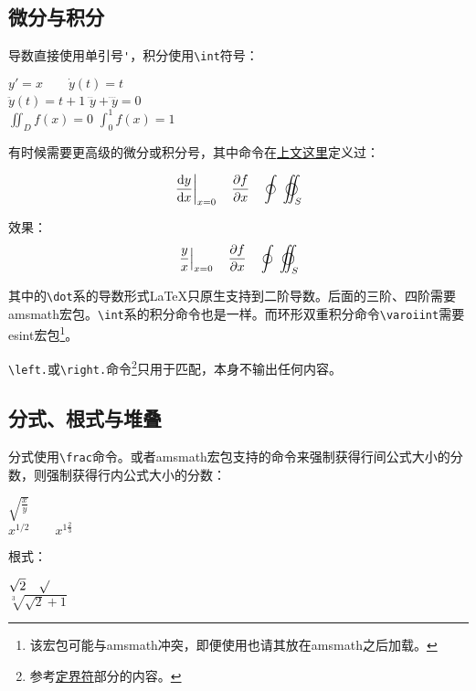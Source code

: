 {\subsection{微分与积分}
导数直接使用单引号\verb|'|，积分使用\verb|\int|符号：

\begin{codeshow}
$y'=x \qquad \dot{y}(t)=t$ \\
$\ddot{y}(t)=t+1$
$\dddot{y}+\ddddot{y}=0$ \\
$\iint_{D}f(x)=0$
$\int_{0}^{1}f(x)=1$
\end{codeshow}

有时候需要更高级的微分或积分号，其中\latexline{\\ud}命令在\hyperref[cmd:ud]{上文这里}定义过：
\begin{latex}{}
\[\left.\frac{\ud y}{\ud x}\right|_{x=0}
\quad\frac{\partial f}{\partial x}
\quad\oint\;\varoiint_S \]
\end{latex}

效果：
\[\left.\frac{y}{x}\right|_{x=0}
\quad\frac{\partial f}{\partial x}\quad
\oint\;\varoiint_S \]

其中的\verb|\dot|系的导数形式\LaTeX 只原生支持到二阶导数。后面的三阶、四阶需要amsmath宏包。\verb|\int|系的积分命令也是一样。而环形双重积分命令\verb|\varoiint|需要esint宏包\footnote{该宏包可能与amsmath冲突，即便使用也请其放在amsmath之后加载。}。

\verb|\left.|或\verb|\right.|命令\footnote{参考\hyperref[subsec:delimiter]{定界符}部分的内容。}只用于匹配，本身不输出任何内容。

\subsection{分式、根式与堆叠}
分式使用\verb|\frac|命令。或者amsmath宏包支持的\latexline{\\dfrac}命令来强制获得行间公式大小的分数，\latexline{\\tfrac}则强制获得行内公式大小的分数：

\begin{codeshow}
  $\sqrt{\frac{x}{y}}$ \\
  $x^{1/2} \qquad x^{1\frac{2}{3}}$
\end{codeshow}

根式：

\begin{codeshow}
  $\sqrt{2} \quad \surd$ \\
  $\sqrt[3]{\sqrt{2}+1}$
\end{codeshow}

}
